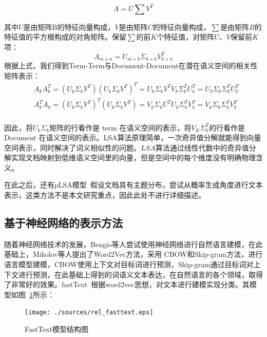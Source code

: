 \begin{equation}
    A=U\sum V^{T}
\end{equation}

其中$U$是由矩阵B的特征向量构成，$V$是由矩阵$C$的特征向量构成，$\sum$是由矩阵$B$的特征值的平方根构成的对角矩阵。保留$\sum$的前$K$个特征值，对矩阵$U$、$V$保留前$K$项：
\begin{equation}
    A_{m\times n}=U_{m\times k}{\Sigma}_{k\times k}V^{T}_{k\times n}
\end{equation}
根据上式，我们得到Term\textrm{-}Term与Document\textrm{-}Document在潜在语义空间的相关性矩阵表示：
\begin{equation}
    \begin{aligned}
        & A_{k}A^{T}_{k}=(U_{k}{\Sigma}_{k}V^{T})(U_{k}{\Sigma}_{k}V^{T})^{T}=U_{k}{\Sigma}_{k}V^{T}V_{k}\Sigma_{k}^{T}U_{k}^{T}=U_{k}\Sigma_{k}\Sigma_{k}^{T}U_{k}^{T} \\
        & A^{T}_{k}A_{k}=(U_{k}{\Sigma}_{k}V^{T})^{T}(U_{k}{\Sigma}_{k}V^{T})=V_{k}{\Sigma}_{k}U^{T}U_{k}\Sigma_{k}^{T}V_{k}^{T}=V_{k}\Sigma_{k}\Sigma_{k}^{T}V_{k}^{T} \\
    \end{aligned}
\end{equation}

因此，将$U_k\Sigma_{k}$矩阵的行看作是 term 在语义空间的表示，将$V_{K}\Sigma_{k}^{T}$的行看作是 Document 在语义空间的表示。LSA算法原理简单，一次奇异值分解就能得到向量空间表示，同时解决了词义相似性的问题。$LSA$算法通过线性代数中的奇异值分解实现文档映射到低维语义空间里的向量，但是空间中的每个维度没有明确物理含义。

在此之后，还有pLSA模型~\cite{Hofmann99}假设文档具有主题分布，尝试从概率生成角度进行文本表示，这类方法不是本文研究重点，因此此处不进行详细描述。

\subsection{基于神经网络的表示方法}
随着神经网络技术的发展，Bengio等人尝试使用神经网络进行自然语言建模\cite{BengioDV00}，在此基础上，Mikolov等人提出了Word2Vec方法\cite{abs-1301-3781}，采用 CBOW和Skip-gram方法，进行语言模型建模，CBOW使用上下文对目标词进行预测，Skip-gram通过目标词对上下文进行预测，在此基础上得到的词语义文本表达，在自然语言的各个领域，取得了非常好的效果。fastText~\cite{GraveMJB17}根据word2vec思想，对文本进行建模实现分类。其模型如图~\ref{fig:fasttext}所示：
\begin{figure}[htb]
    \centering
    \texttt{[image: ./sources/rel\_fasttext.eps]}
    \vspace{-10pt}
    \caption{\label{fig:fasttext} FastText模型结构图}
    \vspace{-5pt}
\end{figure}

